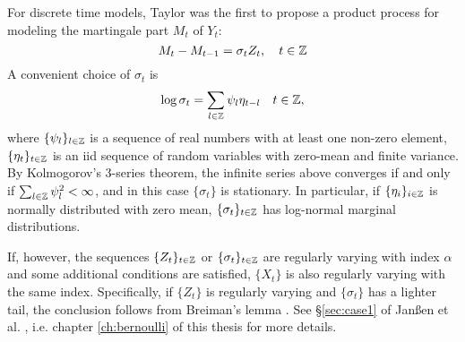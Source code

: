 For discrete time models, Taylor \cite{taylor:1982} was the first to
propose a product process for modeling the martingale part $M_t$ of
$Y_t$:
\[
M_t - M_{t-1}= \sigma_t Z_t, \quad t \in \mathbb Z
\]
A convenient choice of $\sigma_t$ is
\begin{equation}
  \label{eq:rfht}
  \log\sigma_t = \sum_{l \in \mathbb Z} \psi_l \eta_{t-l}
  \quad
  t \in \mathbb Z,
\end{equation}
where $\{\psi_l\}_{l \in \mathbb Z}$ is a sequence of real numbers
with at least one non-zero element,
$\{\eta_t\}_{t \in \mathbb Z}$ is an iid sequence of random
variables with zero-mean and finite variance.
By Kolmogorov's 3-series theorem, the infinite series above
converges if and only if $\sum_{l \in \mathbb Z} \psi_l^2 < \infty$,
and in this case $\{\sigma_{t}\}$ is stationary.
In particular, if $\{\eta_i\}_{i \in \mathbb Z}$ is normally
distributed with zero mean, $\{\sigma_t\}_{t \in \mathbb Z}$ has
log-normal marginal distributions.

If, however, the sequences $\{Z_t\}_{t \in \mathbb Z}$ or
$\{\sigma_t\}_{t \in \mathbb Z}$ are regularly varying with index
$\alpha$ and some additional conditions are satisfied, $\{X_t\}$
is also regularly varying with the same index. Specifically,
if $\{Z_t\}$ is regularly varying and $\{\sigma_t\}$ has a lighter
tail, the conclusion follows from Breiman's lemma \cite{breiman:1965}.
See \S\ref{sec:case1} of Jan\ss en et
al. \cite{janssen:mikosch:rezapour:xie:2016}, i.e. chapter
\ref{ch:bernoulli} of this thesis for more details. 


